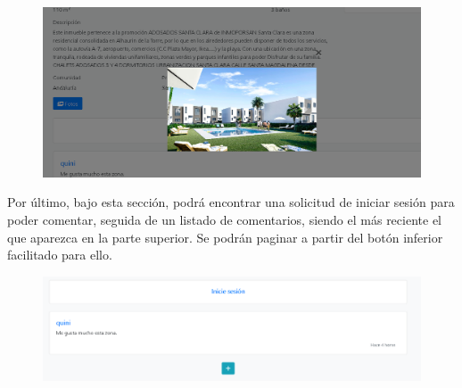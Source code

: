 \begin{figure}[h!]
\centering
\includegraphics[width=.7\textwidth]{Img/ManualUsuario/GALERIA_GUEST.png}
\end{figure}

Por \'{u}ltimo, bajo esta secci\'{o}n, podr\'{a} encontrar una solicitud de iniciar sesi\'{o}n para poder comentar, seguida de un listado de comentarios, siendo el m\'{a}s reciente el que aparezca en la parte superior. Se podr\'{a}n paginar a partir del bot\'{o}n inferior facilitado para ello.

\begin{figure}[h!]
\centering
\includegraphics[width=.7\textwidth]{Img/ManualUsuario/COMENTARIOS_GUEST.png}
\end{figure}